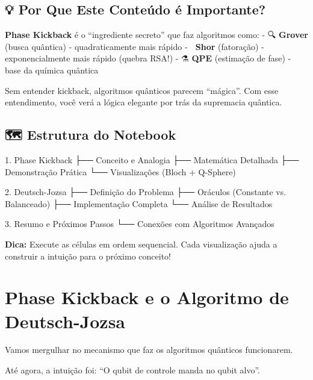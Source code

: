 \documentclass[
  brazilian,
]{report}
\newenvironment{Shaded}{\begin{snugshade}}{\end{snugshade}}
\newcommand{\NormalTok}[1]{\textcolor[rgb]{0.00,0.23,0.31}{#1}}
\begin{document}
\subsection{💡 Por Que Este Conteúdo é
Importante?}\label{por-que-este-conteuxfado-uxe9-importante}

\textbf{Phase Kickback} é o ``ingrediente secreto'' que faz algoritmos
como: - 🔍 \textbf{Grover} (busca quântica) - quadraticamente mais
rápido - 🔢 \textbf{Shor} (fatoração) - exponencialmente mais rápido
(quebra RSA!) - ⚗️ \textbf{QPE} (estimação de fase) - base da química
quântica

Sem entender kickback, algoritmos quânticos parecem ``mágica''. Com esse
entendimento, você verá a lógica elegante por trás da supremacia
quântica.

\subsection{🗺️ Estrutura do Notebook}\label{estrutura-do-notebook}

\begin{Shaded}
\begin{Highlighting}[]
\NormalTok{1. Phase Kickback}
\NormalTok{   ├── Conceito e Analogia}
\NormalTok{   ├── Matemática Detalhada}
\NormalTok{   ├── Demonstração Prática}
\NormalTok{   └── Visualizações (Bloch + Q{-}Sphere)}

\NormalTok{2. Deutsch{-}Jozsa}
\NormalTok{   ├── Definição do Problema}
\NormalTok{   ├── Oráculos (Constante vs. Balanceado)}
\NormalTok{   ├── Implementação Completa}
\NormalTok{   └── Análise de Resultados}

\NormalTok{3. Resumo e Próximos Passos}
\NormalTok{   └── Conexões com Algoritmos Avançados}
\end{Highlighting}
\end{Shaded}

\textbf{Dica:} Execute as células em ordem sequencial. Cada visualização
ajuda a construir a intuição para o próximo conceito!

\section{Phase Kickback e o Algoritmo de
Deutsch-Jozsa}\label{phase-kickback-e-o-algoritmo-de-deutsch-jozsa}

Vamos mergulhar no mecanismo que faz os algoritmos quânticos
funcionarem.

Até agora, a intuição foi: ``O qubit de controle manda no qubit alvo''.
\end{document}
